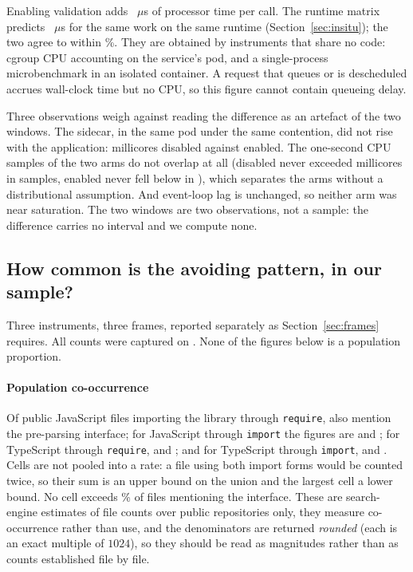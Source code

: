 \documentclass[preprint,12pt,authoryear]{elsarticle}
\begin{document}
Enabling validation adds \AbCpuPerCallDelta~$\mu$s of processor time per
call. The runtime matrix predicts \InsituPredictedFromMatrix~$\mu$s for the same
work on the same runtime (Section~\ref{sec:insitu}); the two agree to within
\AbCpuVsPredictedPct\%. They are obtained by instruments that share no code:
cgroup CPU accounting on the service's pod, and a single-process microbenchmark
in an isolated container. A request that queues or is descheduled accrues
wall-clock time but no CPU, so this figure cannot contain queueing delay.

Three observations weigh against reading the difference as an artefact of the
two windows. The sidecar, in the same pod under the same contention, did not
rise with the application: \AbSidecarCpuNone{} millicores disabled against
\AbSidecarCpuJwt{} enabled. The one-second CPU samples of the two arms do not
overlap at all (disabled never exceeded \AbCpuSampleMaxNone{} millicores in
\AbCpuSamplesNone{} samples, enabled never fell below \AbCpuSampleMinJwt{} in
\AbCpuSamplesJwt{}), which separates the arms without a distributional
assumption. And event-loop lag is unchanged, so neither arm was near
saturation. The two windows are two observations, not a sample: the difference
carries no interval and we compute none.


\subsection{How common is the avoiding pattern, in our
sample?}\label{sec:prevalence}

Three instruments, three frames, reported separately as Section~\ref{sec:frames}
requires. All counts were captured on \PopCapturedAt. None of the figures below
is a population proportion.

\paragraph{Population co-occurrence} Of \PopJsRequireFiles{} public JavaScript
files importing the library through \texttt{require},
\PopJsRequireFilesWithApi{} also mention the pre-parsing interface; for
JavaScript through \texttt{import} the figures are \PopJsImportFiles{} and
\PopJsImportFilesWithApi; for TypeScript through \texttt{require},
\PopTsRequireFiles{} and \PopTsRequireFilesWithApi; and for TypeScript through
\texttt{import}, \PopTsImportFiles{} and \PopTsImportFilesWithApi. Cells are not
pooled into a rate: a file using both import forms would be counted twice, so
their sum \PopSumFiles{} is an upper bound on the union and the largest cell
\PopLargestCellFiles{} a lower bound. No cell exceeds \PopWorstCellPct\% of files
mentioning the interface. These are search-engine estimates of file counts over
public repositories only, they measure co-occurrence rather than use, and the
denominators are returned \emph{rounded} (each is an exact multiple of $1024$), so they should be read as magnitudes rather than as counts established file
by file.
\end{document}
